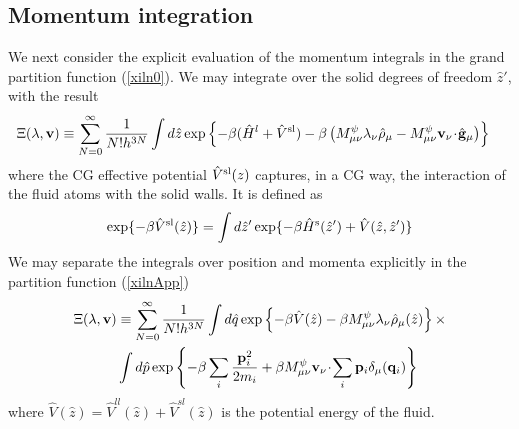 \documentclass[b5paper,openright,11pt]{book}
\newcommand{\esc}{\!\cdot\!}
\begin{document}
\begin{appendices}
\section{Momentum integration}
We next consider the explicit  evaluation of the momentum integrals in
the grand partition function (\ref{xiln0}).  We may integrate over the
solid degrees of freedom $\hat{z}'$, with the result
\begin{align}
&\Xi(\lambda,{\bf v})
\equiv
 \sum_{N=0}^\infty \frac{1}{N!h^{3N}}
\int d\hat{z}
\exp\left\{-\beta (\hat{H}^l +\hat{V}^{\rm sl} )-\beta
\left(M^\psi_{\mu\nu}\lambda_\nu\hat{\rho}_{\mu} 
-M^\psi_{\mu\nu}{\bf v}_\nu\esc\hat{\bf g}_{\mu} \right)\right\}
\label{xilnApp}
\end{align}
where the CG effective potential $\hat{V}^{\rm sl}(z)$ captures, in a CG way, the interaction
of the fluid atoms with the solid walls. It is defined as
\begin{align}
  \exp\{-\beta \hat{V}^{\rm sl}(\hat{z})\}=\int d\hat{z}' 
  \exp\{-\beta \hat{H}^{\rm s}(\hat{z}')+\hat{V}(\hat{z},\hat{z}')\}
\end{align}
We may separate the integrals over position and momenta explicitly in  the partition
function  (\ref{xilnApp})
\begin{align}
\Xi(\lambda,{\bf v})
&\equiv
 \sum_{N=0}^\infty \frac{1}{N!h^{3N}}
\int d\hat{q}
\exp\left\{-\beta \hat{V}(\hat{z})-\beta
M^\psi_{\mu\nu}\lambda_\nu\hat{\rho}_{\mu}(\hat{z})\right\}
\times \nonumber \\
&\int d\hat{p}
\exp\left\{-\beta\sum_i\frac{{\bf p}_i^2}{2m_i}+\beta M^\psi_{\mu\nu}{\bf v}_\nu\esc\sum_i{\bf p}_i\delta_\mu({\bf q}_i)\right\}
\label{xilnApp2}
\end{align}
where $\hat{V}(\hat{z})=\hat{V}^{ll}(\hat{z})+\hat{V}^{sl}(\hat{z})$ is the potential energy of the fluid. 


\end{appendices}
\end{document}
